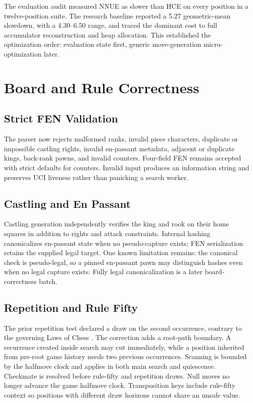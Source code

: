 \documentclass[conference]{IEEEtranSSP}
\begin{document}
The evaluation audit measured NNUE as slower than HCE on every position in a twelve-position suite. The research baseline reported a 5.27 geometric-mean slowdown, with a 4.30--6.50 range, and traced the dominant cost to full accumulator reconstruction and heap allocation. This established the optimization order: evaluation state first, generic move-generation micro-optimization later.

\section{Board and Rule Correctness}
\subsection{Strict FEN Validation}
The parser now rejects malformed ranks, invalid piece characters, duplicate or impossible castling rights, invalid en-passant metadata, adjacent or duplicate kings, back-rank pawns, and invalid counters. Four-field FEN remains accepted with strict defaults for counters. Invalid input produces an information string and preserves UCI liveness rather than panicking a search worker.

\subsection{Castling and En Passant}
Castling generation independently verifies the king and rook on their home squares in addition to rights and attack constraints. Internal hashing canonicalizes en-passant state when no pseudo-capture exists; FEN serialization retains the supplied legal target. One known limitation remains: the canonical check is pseudo-legal, so a pinned en-passant pawn may distinguish hashes even when no legal capture exists. Fully legal canonicalization is a later board-correctness batch.

\subsection{Repetition and Rule Fifty}
The prior repetition test declared a draw on the second occurrence, contrary to the governing Laws of Chess \cite{fide}. The correction adds a root-path boundary. A recurrence created inside search may cut immediately, while a position inherited from pre-root game history needs two previous occurrences. Scanning is bounded by the halfmove clock and applies in both main search and quiescence. Checkmate is resolved before rule-fifty and repetition draws. Null moves no longer advance the game halfmove clock. Transposition keys include rule-fifty context so positions with different draw horizons cannot share an unsafe value.
\end{document}
